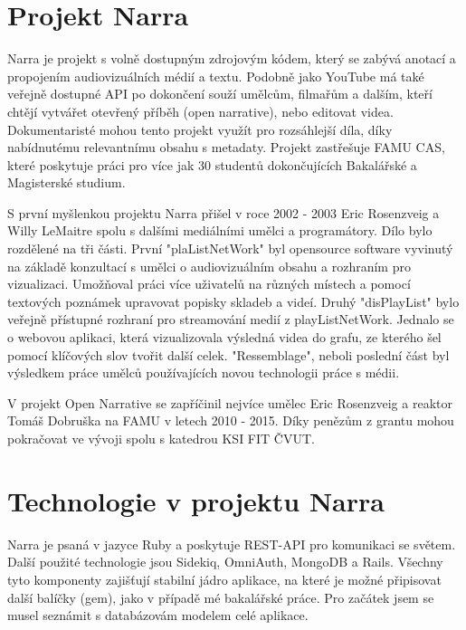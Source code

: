 \section{Projekt Narra}
\par Narra je projekt s volně dostupným zdrojovým kódem, který se zabývá anotací a propojením audiovizuálních médií a textu. Podobně jako YouTube má také veřejně dostupné API po dokončení souží umělcům, filmařům a dalším, kteří chtějí vytvářet otevřený příběh (open narrative), nebo editovat videa. Dokumentaristé mohou tento projekt využít pro rozsáhlejší díla, díky nabídnutému relevantnímu obsahu s metadaty. Projekt zastřešuje FAMU CAS, které poskytuje práci pro více jak 30 studentů dokončujících Bakalářské a Magisterské studium.
\par S první myšlenkou projektu Narra přišel v roce 2002 - 2003 Eric Rosenzveig a Willy LeMaitre spolu s dalšími mediálními umělci a programátory. Dílo bylo rozdělené na tři části. První "plaListNetWork" byl opensource software vyvinutý na základě konzultací s umělci o audiovizuálním obsahu a rozhraním pro vizualizaci. Umožňoval práci více uživatelů na různých místech a pomocí textových poznámek upravovat popisky skladeb a videí. Druhý "disPlayList" bylo veřejně přístupné rozhraní pro streamování medií z playListNetWork. Jednalo se o webovou aplikaci, která vizualizovala výsledná videa do grafu, ze kterého šel pomocí klíčových slov tvořit další celek. "Ressemblage", neboli poslední část byl výsledkem práce umělců používajících novou technologii práce s médii.
\par V projekt Open Narrative se zapříčinil nejvíce umělec Eric Rosenzveig a reaktor Tomáš Dobruška na FAMU v letech 2010 - 2015. Díky penězům z grantu mohou pokračovat ve vývoji spolu s katedrou KSI FIT ČVUT.

\section{Technologie v projektu Narra} 
\par Narra je psaná v jazyce Ruby a poskytuje REST-API pro komunikaci se světem. Další použité technologie jsou Sidekiq, OmniAuth, MongoDB a Rails. Všechny tyto komponenty zajišťují stabilní jádro aplikace, na které je možné připisovat další balíčky (gem), jako v případě mé bakalářské práce. Pro začátek jsem se musel seznámit s databázovám modelem celé aplikace.

